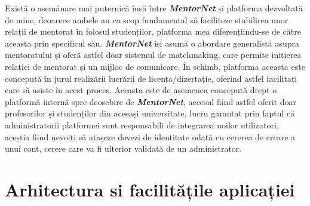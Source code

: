 \documentclass[12pt,a4paper,hidelinks]{report}
\theoremstyle{definition}
\theoremstyle{remark}
\begin{document}
Există o asemănare mai puternică însă între \textbf{\textit{MentorNet}} și platforma dezvoltată de mine, deoarece ambele au ca scop fundamental să faciliteze stabilirea unor relații de mentorat în folosul studenților, platforma mea diferențiindu-se de către aceasta prin specificul său. \textbf{\textit{MentorNet}} își asumă o abordare generalistă asupra mentoratului și oferă astfel doar sistemul de matchmaking, care permite inițierea relației de mentorat și un mijloc de comunicare. În schimb, platforma aceasta este concepută în jurul realizării lucrării de licența/dizertație, oferind astfel facilitați care să asiste în acest proces. Aceasta este de asemenea concepută drept o platformă internă spre deosebire de \textbf{\textit{MentorNet}}, accesul fiind astfel oferit doar profesorilor și studenților din aceeași universitate, lucru garantat prin faptul că administratorii platformei sunt responsabili de integrarea noilor utilizatori, aceștia fiind nevoiți să atașeze dovezi de identitate odată cu cererea de creare a unui cont, cerere care va fi ulterior validată de un administrator.
\chapter{Arhitectura si facilitățile aplicației}
\end{document}
